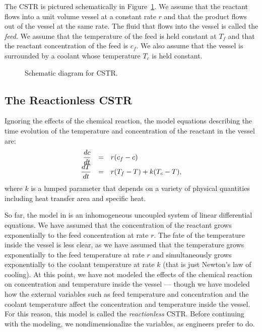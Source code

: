 The CSTR is pictured schematically in Figure~\ref{F:CSTRs}.  We assume 
that the reactant flows into a unit volume vessel at a constant rate 
$r$ and that the product flows out of the vessel at the same rate.  
The fluid that flows into the vessel is called the {\em feed\/}.  
We assume that the temperature of the feed is held constant at
$T_f$ and that the reactant concentration of the feed is $c_f$.
We also assume that the vessel is surrounded by a coolant whose
temperature $T_c$ is held constant.  

\begin{figure}[htb]
           \centerline{%
	   }
           \caption{Schematic diagram for CSTR.}
           \label{F:CSTRs}
\end{figure}


\subsection*{The Reactionless CSTR}

Ignoring the effects of the chemical reaction, the model
equations describing the time evolution of the temperature and
concentration of the reactant in the vessel are:
\arraystart
\begin{equation} \label{e:CSTRlin}
\begin{array}{rcl}
\displaystyle\frac{dc}{dt} & = & r(c_f-c) \\
\displaystyle\frac{dT}{dt} & = & r(T_f-T) + k(T_c-T),
\end{array}
\end{equation}
\arrayfinish   {} 
where $k$ is a lumped parameter that depends on a variety of
physical quantities including heat transfer area and specific
heat.  

So far, the model in  is an inhomogeneous uncoupled system
of linear differential equations.  We have assumed that the concentration 
of the reactant grows exponentially to the feed concentration at rate
$r$.  The fate of the temperature inside the vessel is less
clear, as we have assumed that the temperature grows exponentially to 
the feed temperature at rate $r$ and simultaneously grows
exponentially to the coolant temperature at rate $k$ (that is
just Newton's law of cooling).  
At this point, we have not modeled the effects of the chemical reaction 
on concentration and temperature inside the vessel --- though we have modeled 
how the external variables such as feed temperature and concentration and 
the coolant temperature affect the concentration and temperature inside the 
vessel.  For this reason, this model is called the {\em reactionless\/} CSTR. 
Before continuing with the modeling, we 
nondimensionalize the variables, as 
engineers prefer to do.

